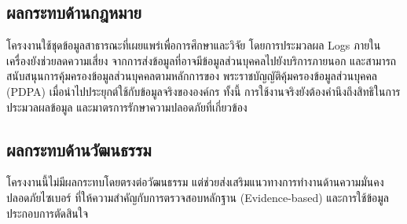 \subsection{ผลกระทบด้านกฎหมาย}
โครงงานใช้ชุดข้อมูลสาธารณะที่เผยแพร่เพื่อการศึกษาและวิจัย
โดยการประมวลผล Logs ภายในเครื่องยังช่วยลดความเสี่ยง
จากการส่งข้อมูลที่อาจมีข้อมูลส่วนบุคคลไปยังบริการภายนอก
และสามารถสนับสนุนการคุ้มครองข้อมูลส่วนบุคคลตามหลักการของ
พระราชบัญญัติคุ้มครองข้อมูลส่วนบุคคล (PDPA)
เมื่อนำไปประยุกต์ใช้กับข้อมูลจริงขององค์กร ทั้งนี้
การใช้งานจริงยังต้องคำนึงถึงสิทธิในการประมวลผลข้อมูล
และมาตรการรักษาความปลอดภัยที่เกี่ยวข้อง

\subsection{ผลกระทบด้านวัฒนธรรม}
โครงงานนี้ไม่มีผลกระทบโดยตรงต่อวัฒนธรรม
แต่ช่วยส่งเสริมแนวทางการทำงานด้านความมั่นคงปลอดภัยไซเบอร์
ที่ให้ความสำคัญกับการตรวจสอบหลักฐาน (Evidence-based)
และการใช้ข้อมูลประกอบการตัดสินใจ
